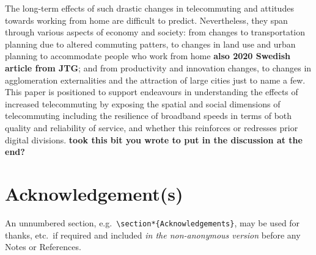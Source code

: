 \documentclass[,]{sagej}
\begin{document}
The long-term effects of such drastic changes in telecommuting and
attitudes towards working from home are difficult to predict.
Nevertheless, they span through various aspects of economy and society:
from changes to transportation planning due to altered commuting
patters, to changes in land use and urban planning to accommodate people
who work from home \citep{BUDNITZ2020102713}\textbf{also 2020 Swedish
article from JTG}; and from productivity and innovation changes, to
changes in agglomeration externalities and the attraction of large
cities \citep{econobs} just to name a few. This paper is positioned to
support endeavours in understanding the effects of increased
telecommuting by exposing the spatial and social dimensions of
telecommuting including the resilience of broadband speeds in terms of
both quality and reliability of service, and whether this reinforces or
redresses prior digital divisions. \textbf{took this bit you wrote to
put in the discussion at the end?}

\hypertarget{acknowledgements}{%
\section*{Acknowledgement(s)}\label{acknowledgements}}

An unnumbered section,
e.g.~\texttt{\textbackslash{}section*\{Acknowledgements\}}, may be used
for thanks, etc.~if required and included \emph{in the non-anonymous
version} before any Notes or References.



\end{document}
